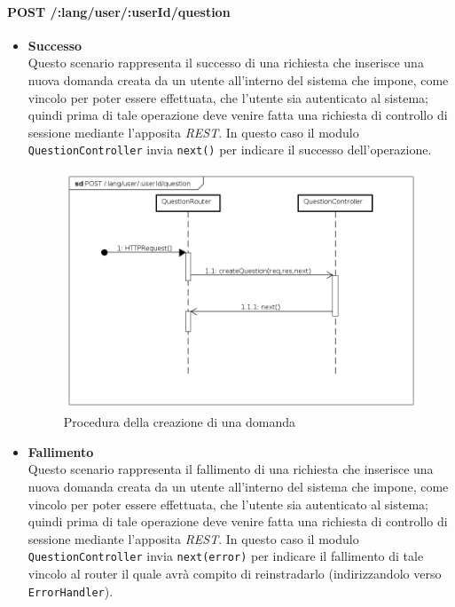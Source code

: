 \paragraph{POST /:lang/user/:userId/question}
\begin{itemize}
\item \textbf{Successo}\\
Questo scenario rappresenta il successo di una richiesta che inserisce una nuova domanda creata da un utente all'interno del sistema che impone, come vincolo per poter essere effettuata, che l'utente sia autenticato al sistema; quindi prima di tale operazione deve venire fatta una richiesta di controllo di sessione mediante l'apposita \textit{REST}. In questo caso il modulo \texttt{QuestionController} invia \texttt{next()} per indicare il successo dell'operazione.


\begin{figure}[ht]
	\centering
	\includegraphics[scale=0.45]{UML/DiagrammiDiSequenza/Back-end/POST__lang_user__userId_question_success.png}
	\caption{Procedura della creazione di una domanda}
\end{figure}
\FloatBarrier

\item \textbf{Fallimento}\\
Questo scenario rappresenta il fallimento di una richiesta che inserisce una nuova domanda creata da un utente all'interno del sistema che impone, come vincolo per poter essere effettuata, che l'utente sia autenticato al sistema; quindi prima di tale operazione deve venire fatta una richiesta di controllo di sessione mediante l'apposita \textit{REST}. In questo caso il modulo \texttt{QuestionController} invia \texttt{next(error)} per indicare il fallimento di tale vincolo al router il quale avrà compito di reinstradarlo (indirizzandolo verso \texttt{ErrorHandler}).


\end{itemize}
